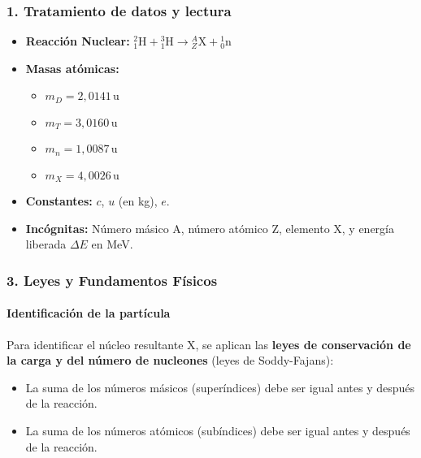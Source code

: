 \subsubsection*{1. Tratamiento de datos y lectura}
\begin{itemize}
    \item \textbf{Reacción Nuclear:} ${}_1^2\text{H} + {}_1^3\text{H} \to {}_Z^A\text{X} + {}_0^1\text{n}$
    \item \textbf{Masas atómicas:}
    \begin{itemize}
        \item $m_D = 2,0141\,\text{u}$
        \item $m_T = 3,0160\,\text{u}$
        \item $m_n = 1,0087\,\text{u}$
        \item $m_X = 4,0026\,\text{u}$
    \end{itemize}
    \item \textbf{Constantes:} $c$, $u$ (en kg), $e$.
    \item \textbf{Incógnitas:} Número másico A, número atómico Z, elemento X, y energía liberada $\Delta E$ en MeV.
\end{itemize}

\subsubsection*{3. Leyes y Fundamentos Físicos}
\paragraph{Identificación de la partícula}
Para identificar el núcleo resultante X, se aplican las \textbf{leyes de conservación de la carga y del número de nucleones} (leyes de Soddy-Fajans):
\begin{itemize}
    \item La suma de los números másicos (superíndices) debe ser igual antes y después de la reacción.
    \item La suma de los números atómicos (subíndices) debe ser igual antes y después de la reacción.
\end{itemize}
